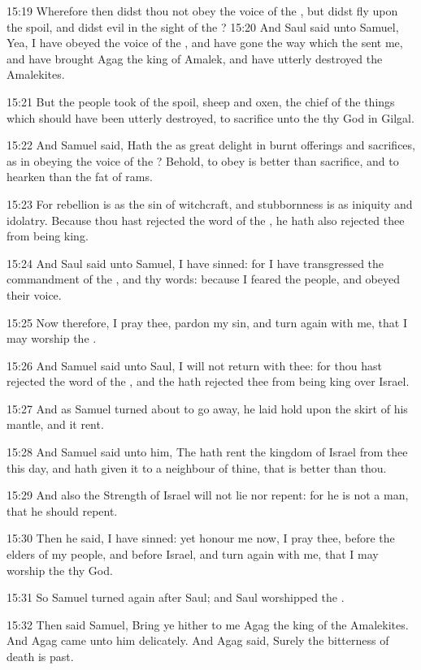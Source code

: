 15:19 Wherefore then didst thou not obey the voice of the \LORD, but
didst fly upon the spoil, and didst evil in the sight of the \LORD?
15:20 And Saul said unto Samuel, Yea, I have obeyed the voice of the
\LORD, and have gone the way which the \LORD sent me, and have brought
Agag the king of Amalek, and have utterly destroyed the Amalekites.

15:21 But the people took of the spoil, sheep and oxen, the chief of
the things which should have been utterly destroyed, to sacrifice unto
the \LORD thy God in Gilgal.

15:22 And Samuel said, Hath the \LORD as great delight in burnt
offerings and sacrifices, as in obeying the voice of the \LORD? Behold,
to obey is better than sacrifice, and to hearken than the fat of rams.

15:23 For rebellion is as the sin of witchcraft, and stubbornness is
as iniquity and idolatry. Because thou hast rejected the word of the
\LORD, he hath also rejected thee from being king.

15:24 And Saul said unto Samuel, I have sinned: for I have
transgressed the commandment of the \LORD, and thy words: because I
feared the people, and obeyed their voice.

15:25 Now therefore, I pray thee, pardon my sin, and turn again with
me, that I may worship the \LORD.

15:26 And Samuel said unto Saul, I will not return with thee: for thou
hast rejected the word of the \LORD, and the \LORD hath rejected thee
from being king over Israel.

15:27 And as Samuel turned about to go away, he laid hold upon the
skirt of his mantle, and it rent.

15:28 And Samuel said unto him, The \LORD hath rent the kingdom of
Israel from thee this day, and hath given it to a neighbour of thine,
that is better than thou.

15:29 And also the Strength of Israel will not lie nor repent: for he
is not a man, that he should repent.

15:30 Then he said, I have sinned: yet honour me now, I pray thee,
before the elders of my people, and before Israel, and turn again with
me, that I may worship the \LORD thy God.

15:31 So Samuel turned again after Saul; and Saul worshipped the \LORD.

15:32 Then said Samuel, Bring ye hither to me Agag the king of the
Amalekites. And Agag came unto him delicately. And Agag said, Surely
the bitterness of death is past.

